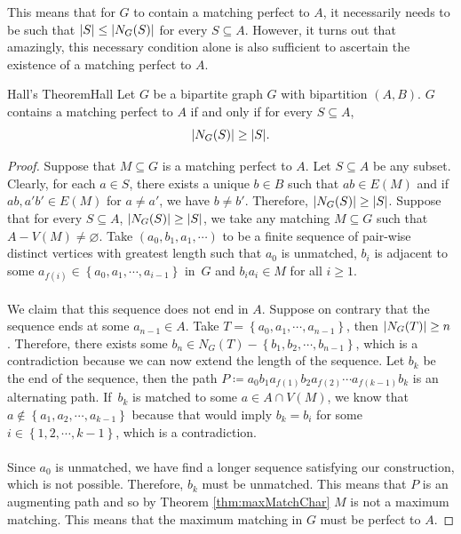 \documentclass[math]{amznotes}
\theoremstyle{remark}
\newcommand{\0}{\mathbf{0}}
\newcommand{\1}{\mathbf{1}}
\begin{document}
This means that for $G$ to contain a matching perfect to $A$, it necessarily needs to be such that ${\left\lvert {S} \right\rvert} \leq {\left\lvert {N_G(S)} \right\rvert}$ for every $S \subseteq A$. However, it turns out that amazingly, this necessary condition alone is also sufficient to ascertain the existence of a matching perfect to $A$.
\begin{thmbox}{Hall's Theorem}{Hall}
    Let $G$ be a bipartite graph $G$ with bipartition $(A, B)$. $G$ contains a matching perfect to $A$ if and only if for every $S \subseteq A$,
    \begin{equation*}
        {\left\lvert {N_G(S)} \right\rvert} \geq {\left\lvert {S} \right\rvert}.
    \end{equation*}
    \tcblower
    \begin{proof}
        Suppose that $M \subseteq G$ is a matching perfect to $A$. Let $S \subseteq A$ be any subset. Clearly, for each $a \in S$, there exists a unique $b \in B$ such that $ab \in E(M)$ and if~$ab, a'b' \in E(M)$ for $a \neq a'$, we have $b \neq b'$. Therefore, ${\left\lvert {N_G(S)} \right\rvert} \geq {\left\lvert {S} \right\rvert}$. Suppose that for every $S \subseteq A$, ${\left\lvert {N_G(S)} \right\rvert} \geq {\left\lvert {S} \right\rvert}$, we take any matching $M \subseteq G$ such that $A - V(M) \neq \varnothing$. Take $(a_0, b_1, a_1, \cdots)$ to be a finite sequence of pair-wise distinct vertices with greatest length such that $a_0$ is unmatched, $b_i$ is adjacent to some $a_{f(i)} \in \left\{a_0, a_1, \cdots, a_{i - 1}\right\}$ in~$G$ and $b_ia_i \in M$ for all $i \geq 1$.
        \\\\
        We claim that this sequence does not end in $A$. Suppose on contrary that the sequence ends at some $a_{n - 1} \in A$. Take $T = \left\{a_0, a_1, \cdots, a_{n - 1}\right\}$, then ${\left\lvert {N_G(T)} \right\rvert} \geq n$. Therefore, there exists some $b_n \in N_G(T) - \left\{b_1, b_2, \cdots, b_{n - 1}\right\}$, which is a contradiction because we can now extend the length of the sequence. Let $b_k$ be the end of the sequence, then the path $P \coloneqq a_0b_1a_{f(1)}b_2a_{f(2)}\cdots a_{f(k - 1)}b_k$ is an alternating path. If~$b_k$ is matched to some $a \in A \cap V(M)$, we know that $a \notin \left\{a_1, a_2,\cdots, a_{k - 1}\right\}$ because that would imply $b_k = b_i$ for some $i \in \left\{1, 2, \cdots, k - 1\right\}$, which is a contradiction. 
        \\\\
        Since $a_0$ is unmatched, we have find a longer sequence satisfying our construction, which is not possible. Therefore, $b_k$ must be unmatched. This means that $P$ is an augmenting path and so by Theorem \ref{thm:maxMatchChar} $M$ is not a maximum matching. This means that the maximum matching in $G$ must be perfect to $A$.
    \end{proof}
\end{thmbox}
\end{document}
